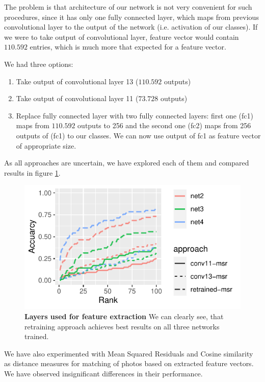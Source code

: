 \documentclass[fleqn,moreauthors,10pt]{ds_report}
\begin{document}
The problem is that architecture of our network is not very convenient for such procedures, since it has only one fully connected layer, which maps from previous convolutional layer to the output of the network (i.e. activation of our classes). If we were to take output of convolutional layer, feature vector would contain $110.592$ entries, which is much more that expected for a feature vector.

We had three options:
\begin{enumerate}
	\item Take output of convolutional layer 13 ($110.592$ outputs)
	\item Take output of convolutional layer 11 ($73.728$ outputs)
	\item Replace fully connected layer with two fully connected layers: first one (fc1) maps from $110.592$ outputs to 256 and the second one (fc2) maps from 256 outputs of (fc1) to our classes. We can now use output of fc1 as feature vector of appropriate size.
\end{enumerate}

As all approaches are uncertain, we have explored each of them and compared results in figure \ref{fig:ranks-layer-selection}.

\begin{figure}[htb]\centering
	\includegraphics[width=\linewidth]{ranks-ident-layer-selection.pdf}
	\caption{\textbf{Layers used for feature extraction} We can clearly see, that retraining approach achieves best results on all three networks trained.}
	\label{fig:ranks-layer-selection}
\end{figure}

We have also experimented with Mean Squared Residuals and Cosine similarity as distance measures for matching of photos based on extracted feature vectors. We have observed insignificant differences in their performance.
\end{document}
